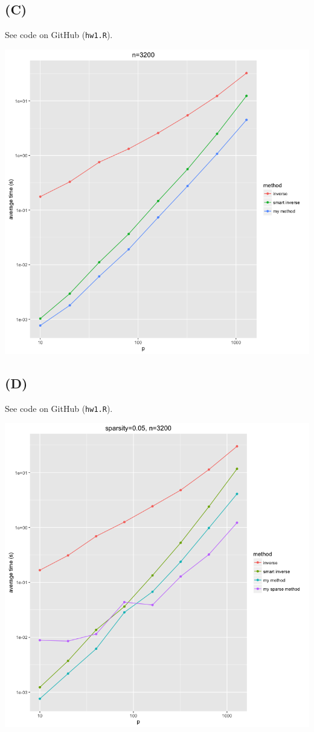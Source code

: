 \documentclass{article}
\begin{document}
\subsection{(C)}
See code on GitHub (\texttt{hw1.R}).

\includegraphics[scale=0.5]{log_methods.png}

\subsection{(D)}
See code on GitHub (\texttt{hw1.R}).

\includegraphics[scale=0.5]{sparse.png}
\end{document}
